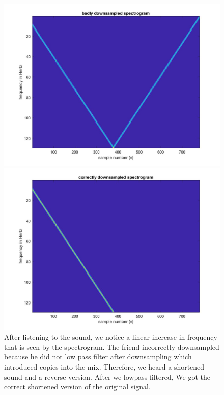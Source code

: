 \documentclass{article}
\begin{document}
\begin{figure}[H]
\includegraphics[scale = .5]{Blackdog2}
\includegraphics[scale = .5]{Blackdog3}
After listening to the sound, we notice a linear increase in frequency that is seen by the spectrogram. The friend incorrectly downsampled because he did not low pass filter after downsampling which introduced copies into the mix.
Therefore, we heard a shortened sound and a reverse version. After we lowpass filtered, We got the correct shortened version of the original signal.
\end{figure}
\end{document}

